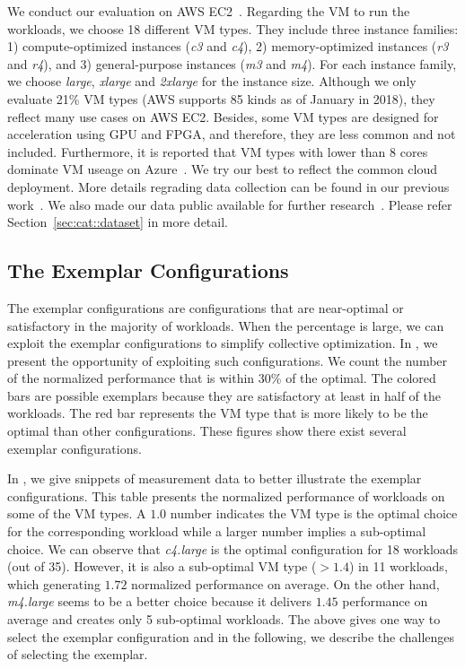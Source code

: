We conduct our evaluation on AWS EC2~\cite{aws}.
Regarding the VM to run the workloads, we choose 18 different VM types.
They include three instance families:
1) compute-optimized instances (\emph{c3} and \emph{c4}),
2) memory-optimized instances (\emph{r3} and \emph{r4}), and
3) general-purpose instances (\emph{m3} and \emph{m4}).
For each instance family, we choose \emph{large}, \emph{xlarge} and \emph{2xlarge} for the instance size.
Although we only evaluate 21\% VM types (AWS supports 85 kinds as of January in 2018),
they reflect many use cases on AWS EC2.
Besides, some VM types are designed for acceleration using GPU and FPGA, and therefore, they are less common and not included.
Furthermore, it is reported that VM types with lower than 8 cores dominate VM useage on Azure~\cite{Cortez2017}.
We try our best to reflect the common cloud deployment.
More details regrading data collection can be found in our previous work~\cite{Hsu2018Arrow, Hsu2018Scout}.
We also made our data public available for further research~\cite{scoutdataset}.
Please refer Section~\ref{sec:cat::dataset} in more detail.



\subsection{The Exemplar Configurations}
\label{sec:exemplar}
The exemplar configurations are configurations that
are near-optimal or satisfactory in the majority of workloads.
When the percentage is large, 
we can exploit the exemplar configurations to simplify collective optimization.
In \myfigure{\ref{fig:motivation_percentage}}, we present the opportunity of exploiting such configurations.
We count the number of the normalized performance that is within 30\% of the optimal.
The colored bars are possible exemplars because they are satisfactory at least in half of the workloads.
The red bar represents the VM type that is more likely to be the optimal than other configurations.
These figures show there exist several exemplar configurations.




In \mytable{\ref{table:dataset}}, we give snippets of measurement data to better illustrate the exemplar configurations.
This table presents the normalized performance of workloads on some of the VM types.
A $1.0$ number indicates the VM type is the optimal choice for the corresponding workload while a larger number implies a sub-optimal choice.
We can observe that \emph{c4.large} is the optimal configuration for 18 workloads (out of 35).
However, it is also a sub-optimal VM type ($>1.4$) in 11 workloads, which generating
$1.72$ normalized performance on average.
On the other hand, \emph{m4.large} seems to be a better choice because it delivers $1.45$ performance on average and creates only 5 sub-optimal workloads.
The above gives one way to select the exemplar configuration and in the following,
we describe the challenges of selecting the exemplar.



